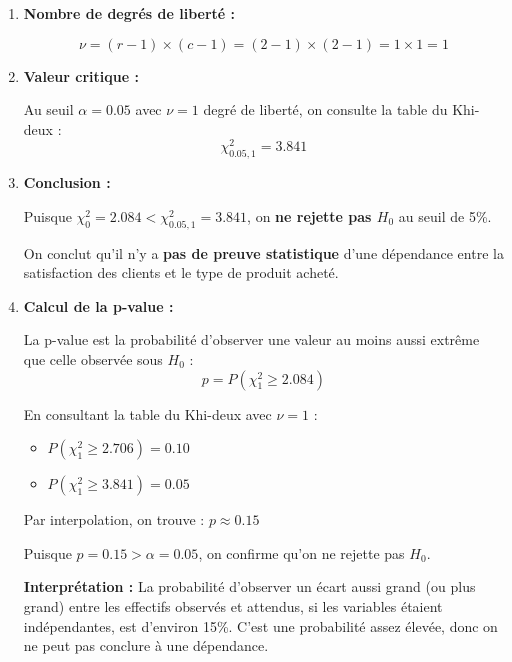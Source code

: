 \documentclass[11pt,a4paper]{article}
\newcommand{\chideux}{\chi^2}
\begin{document}
\begin{enumerate}
    Calculons chaque terme :
    \begin{align}
    \frac{(O_{11} - E_{11})^2}{E_{11}} &= \frac{(45 - 40)^2}{40} = \frac{25}{40} = 0.625 \\
    \frac{(O_{12} - E_{12})^2}{E_{12}} &= \frac{(55 - 60)^2}{60} = \frac{25}{60} = 0.417 \\
    \frac{(O_{21} - E_{21})^2}{E_{21}} &= \frac{(35 - 40)^2}{40} = \frac{25}{40} = 0.625 \\
    \frac{(O_{22} - E_{22})^2}{E_{22}} &= \frac{(65 - 60)^2}{60} = \frac{25}{60} = 0.417
    \end{align}
    
    Donc :
    $$\chideux_0 = 0.625 + 0.417 + 0.625 + 0.417 = 2.084$$
    
    \item \textbf{Nombre de degrés de liberté :}
    
    $$\nu = (r - 1) \times (c - 1) = (2 - 1) \times (2 - 1) = 1 \times 1 = 1$$
    
    \item \textbf{Valeur critique :}
    
    Au seuil $\alpha = 0.05$ avec $\nu = 1$ degré de liberté, on consulte la table du Khi-deux :
    $$\chideux_{0.05, 1} = 3.841$$
    
    \item \textbf{Conclusion :}
    
    Puisque $\chideux_0 = 2.084 < \chideux_{0.05, 1} = 3.841$, on \textbf{ne rejette pas $H_0$} au seuil de 5\%.
    
    On conclut qu'il n'y a \textbf{pas de preuve statistique} d'une dépendance entre la satisfaction des clients et le type de produit acheté.
    
    \item \textbf{Calcul de la p-value :}
    
    La p-value est la probabilité d'observer une valeur au moins aussi extrême que celle observée sous $H_0$ :
    $$p = P(\chideux_1 \geq 2.084)$$
    
    En consultant la table du Khi-deux avec $\nu = 1$ :
    \begin{itemize}
        \item $P(\chideux_1 \geq 2.706) = 0.10$
        \item $P(\chideux_1 \geq 3.841) = 0.05$
    \end{itemize}
    
    Par interpolation, on trouve : $p \approx 0.15$
    
    Puisque $p = 0.15 > \alpha = 0.05$, on confirme qu'on ne rejette pas $H_0$.
    
    \textbf{Interprétation :} La probabilité d'observer un écart aussi grand (ou plus grand) entre les effectifs observés et attendus, si les variables étaient indépendantes, est d'environ 15\%. C'est une probabilité assez élevée, donc on ne peut pas conclure à une dépendance.
\end{enumerate}
\end{document}
